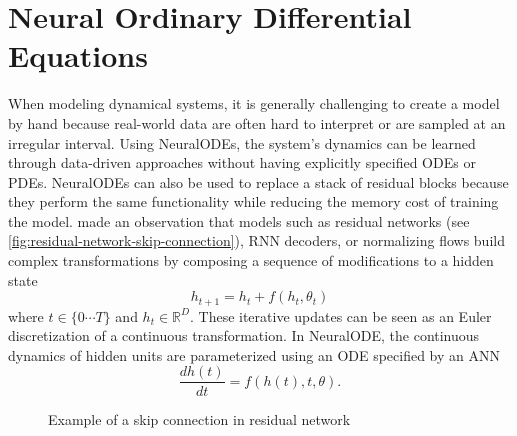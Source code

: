 \section{Neural Ordinary Differential Equations}
\label{sec:literature-review-neural-ordinary-differential-equations}

When modeling dynamical systems, it is generally challenging to create a model by hand because real-world data are often hard to interpret or are sampled at an irregular interval.
Using \glspl{NeuralODE}, the system's dynamics can be learned through data-driven approaches without having explicitly specified \glspl{ODE} or \glspl{PDE}.
\glspl{NeuralODE} can also be used to replace a stack of residual blocks because they perform the same functionality while reducing the memory cost of training the model.
\citeauthor{chenNeuralOrdinaryDifferential2019} made an observation that models such as residual networks (see \autoref{fig:residual-network-skip-connection}), \gls{RNN} decoders, or normalizing flows build complex transformations by composing a sequence of modifications to a hidden state \cite{chenNeuralOrdinaryDifferential2019}
\begin{equation*}
    h_{t+1} = h_t + f(h_t, \theta_t)
\end{equation*}
where $t \in \{0 \cdots T\}$ and $h_t \in \mathbb{R}^D$.
These iterative updates can be seen as an Euler discretization of a continuous transformation.
In \gls{NeuralODE}, the continuous dynamics of hidden units are parameterized using an \gls{ODE} specified by an \gls{ANN} \cite{chenNeuralOrdinaryDifferential2019}
\begin{equation*}
    \frac{dh(t)}{dt} = f(h(t), t, \theta).
\end{equation*}

\begin{figure}[h]
    \centering
    \caption{Example of a skip connection in residual network}
    \label{fig:residual-network-skip-connection}
\end{figure}

